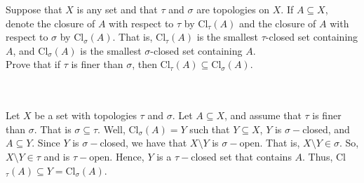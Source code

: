 Suppose that $X$ is any set and that $\tau$ and $\sigma$ are topologies on $X$. If $A\subseteq X$,
denote the closure of $A$ with respect to $\tau$ by $\text{Cl}_{\tau} (A)$ and the closure of $A$ with
respect to $\sigma$ by $\text{Cl}_{\sigma} (A)$. That is, $\text{Cl}_{\tau} (A)$ is the smallest
$\tau$-closed set containing $A$, and $\text{Cl}_{\sigma} (A)$ is the smallest $\sigma$-closed set
containing $A$.\\
Prove that if $\tau$ is finer than $\sigma$, then
$\text{Cl}_{\tau} (A)\subseteq \text{Cl}_{\sigma} (A)$.\\\\


\begin{solution}\renewcommand{\qedsymbol}{}\ \\
    Let $X$ be a set with topologies $\tau$ and $\sigma$. Let $A\subseteq X$, and assume that $\tau$ is
    finer than $\sigma$. That is $\sigma\subseteq\tau$. Well, Cl$_{\sigma}(A)=Y$ such that
    $Y\subseteq X$, $Y$ is $\sigma-$closed, and $A\subseteq Y$. Since $Y$ is $\sigma-$closed, we have
    that $X\setminus Y$ is $\sigma-$open. That is, $X\setminus Y\in\sigma$. So, $X\setminus Y\in\tau$
    and is $\tau-$open. Hence, $Y$ is a $\tau-$closed set that contains $A$. Thus,
    Cl$_{\tau}(A)\subseteq Y=$Cl$_{\sigma}(A)$.

\end{solution}